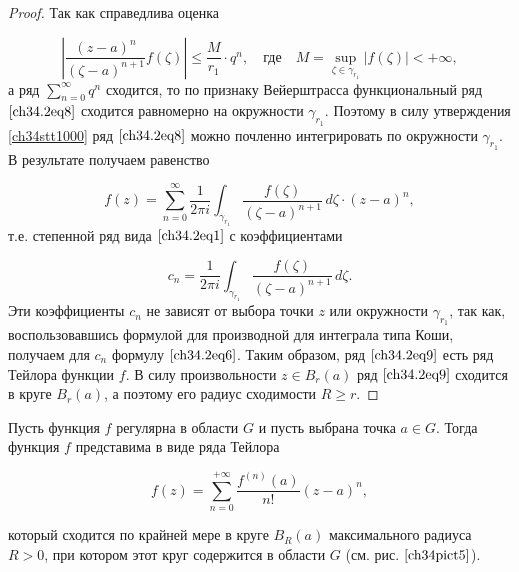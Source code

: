 \begin{proof}
Так как справедлива оценка

$$
\left| \frac{(z - a)^n}{(\zeta - a)^{n + 1}} f(\zeta) \right| \le \frac{M}{r_1} \cdot q^n, \quad \text{где} \quad M = \sup_{\zeta \in \gamma_{r_1}} |f(\zeta)| < +\infty,
$$
а ряд $\sum\limits_{n = 0}^{\infty} q^n$ сходится, то по признаку Вейерштрасса функциональный ряд $\eqref{ch34.2eq8}$ сходится равномерно на окружности $\gamma_{r_1}$. Поэтому в силу утверждения \ref{ch34stt1000} ряд $\eqref{ch34.2eq8}$ можно почленно интегрировать по окружности $\gamma_{r_1}$. В результате получаем равенство

\begin{equation} \label{ch34.2eq9}
f(z) = \sum\limits_{n = 0}^{\infty} \frac{1}{2\pi i} \int_{\gamma_{r_1}} \frac{f(\zeta)}{(\zeta - a)^{n + 1}} \,d\zeta \cdot (z - a)^n,
\end{equation}
т.е. степенной ряд вида $\eqref{ch34.2eq1}$ с коэффициентами

\begin{equation} \label{ch34.2eq10}
c_n = \frac{1}{2\pi i} \int_{\gamma_{r_1}} \frac{f(\zeta)}{(\zeta - a)^{n + 1}} \,d\zeta.
\end{equation}
Эти коэффициенты $c_n$ не зависят от выбора точки $z$ или окружности $\gamma_{r_1}$, так как, воспользовавшись формулой для производной для интеграла типа Коши, получаем для $c_n$ формулу $\eqref{ch34.2eq6}$. Таким образом, ряд $\eqref{ch34.2eq9}$ есть ряд Тейлора функции $f$. В силу произвольности $z \in B_r(a)$ ряд $\eqref{ch34.2eq9}$ сходится в круге $B_r(a)$, а поэтому его радиус сходимости $R \ge r$.
\end{proof}

\begin{cons} \label{cons1}
Пусть функция $f$ регулярна в области $G$ и пусть выбрана точка $a \in G$. Тогда функция $f$ представима в виде ряда Тейлора 

 \label{ch34pict5}

$$
f(z) = \sum\limits_{n = 0}^{+\infty} \frac{f^{(n)}(a)}{n!} (z - a)^n,
$$

который сходится по крайней мере в круге $B_R(a)$ максимального радиуса $R > 0$, при котором этот круг содержится в области $G$ (см. рис. $\ref{ch34pict5}$).

\end{cons}